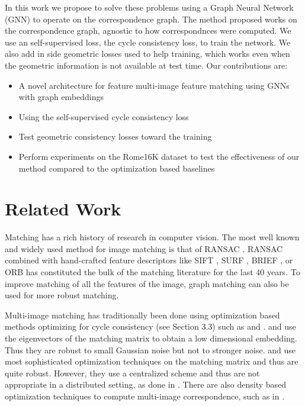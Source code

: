 \documentclass[10pt,twocolumn,letterpaper]{article}
\begin{document}
In this work we propose to solve these problems using a Graph Neural Network (GNN) to operate on the correspondence graph.
The method proposed works on the correspondence graph, agnostic to how correspondnces were computed.
We use an self-supervised loss, the cycle consistency loss, to train the network.
We also add in side geometric losses used to help training, which works even when the geometric information is not available at test time.
Our contributions are:
\begin{itemize}
\item A novel architecture for feature multi-image feature matching using GNNs with graph embeddings
\item Using the self-supervised cycle consistency loss
\item Test geometric consistency losses toward the training
\item Perform experiments on the Rome16K \cite{li2010location} dataset to test the effectiveness of our method compared to the optimization based baselines
\end{itemize}


\section{Related Work}

Matching has a rich history of research in computer vision.
The most well known and widely used method for image matching is that of RANSAC \cite{fischler1981random}.
RANSAC combined with hand-crafted feature descriptors like SIFT \cite{lowe2004distinctive}, SURF \cite{bay2006surf}, BRIEF \cite{calonder2012brief}, or ORB \cite{mur2015orb} has constituted the bulk of the matching literature for the last 40 years.
To improve matching of all the features of the image, graph matching \cite{suh2015subgraph, hu2016distributable} can also be used for more robust matching.

Multi-image matching has traditionally been done using optimization based methods optimizing for cycle consistency (see Section 3.3) such as \cite{pachauri2013solving,zhou2015multi,arrigoni2017synchronization} and \cite{wang2017multi}.
\cite{pachauri2013solving} and \cite{arrigoni2017synchronization} use the eigenvectors of the matching matrix to obtain a low dimensional embedding. 
Thus they are robust to small Gaussian noise but not to stronger noise.
\cite{zhou2015multi} and \cite{wang2017multi} use most sophisticated optimization techniques on the matching matrix and thus are quite robust.
However, they use a centralized scheme and thus are not appropriate in a distributed setting,
as done in \cite{leonardos2016distributed}.
There are also density based optimization techniques to compute multi-image correspondence, such as in \cite{tron2017fast}.
\end{document}
